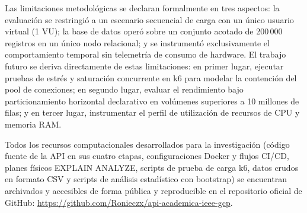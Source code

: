 \documentclass[conference]{IEEEtran}
\begin{document}
Las limitaciones metodológicas se declaran formalmente en tres aspectos: la evaluación se restringió a un escenario secuencial de carga con un único usuario virtual (1 VU); la base de datos operó sobre un conjunto acotado de 200\,000 registros en un único nodo relacional; y se instrumentó exclusivamente el comportamiento temporal sin telemetría de consumo de hardware. El trabajo futuro se deriva directamente de estas limitaciones: en primer lugar, ejecutar pruebas de estrés y saturación concurrente en k6 para modelar la contención del pool de conexiones; en segundo lugar, evaluar el rendimiento bajo particionamiento horizontal declarativo en volúmenes superiores a 10 millones de filas; y en tercer lugar, instrumentar el perfil de utilización de recursos de CPU y memoria RAM.

Todos los recursos computacionales desarrollados para la investigación (código fuente de la API en sus cuatro etapas, configuraciones Docker y flujos CI/CD, planes físicos EXPLAIN ANALYZE, scripts de prueba de carga k6, datos crudos en formato CSV y scripts de análisis estadístico con bootstrap) se encuentran archivados y accesibles de forma pública y reproducible en el repositorio oficial de GitHub: \url{https://github.com/Ronieczx/api-academica-ieee-gcp}.
\end{document}
